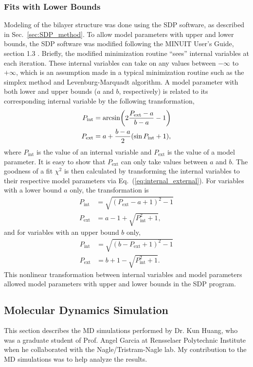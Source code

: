 \subsubsection{Fits with Lower Bounds}
Modeling of the bilayer structure was done using the SDP software, 
as described in Sec.~\ref{sec:SDP_method}.
To allow model parameters with upper and lower bounds, the
SDP software was modified following the MINUIT User's Guide, section 1.3 
\cite{minuit}. 
Briefly, the modified minimization routine ``sees'' internal variables 
at each iteration. These internal variables can take on
any values between $-\infty$ to $+\infty$, which is an assumption made
in a typical minimization routine such as 
the simplex method and Levenburg-Marquadt algorithm.
A model parameter with both lower and upper bounds ($a$ and $b$, respectively) 
is related to its corresponding internal variable by the following transformation,
\begin{align}
  P_\textrm{int} &= \arcsin \mathopen{}\left( 2\frac{P_\textrm{ext}-a}{b-a}-1 \right)\mathclose{}  \\
  P_\textrm{ext} &= a + \frac{b-a}{2}(\sin P_\textrm{int}+1),
  \label{eq:internal_external}
\end{align}
where $P_\text{int}$ is the value of an internal variable and
$P_\text{ext}$ is the value of a model parameter. It is easy to show that
$P_\text{ext}$ can only take values between $a$ and $b$.
The goodness of a fit $\chi^2$ is then calculated by transforming the
internal variables to their respective model parameters via Eq.~(\ref{eq:internal_external}). 
For variables with a lower bound $a$ only, the transformation is
\begin{align}
  P_\textrm{int} &= \sqrt{(P_\textrm{ext}-a+1)^2 - 1} \\
  P_\textrm{ext} &= a - 1 + \sqrt{P_\textrm{int}^2+1}, 
\end{align}
and for variables with an upper bound $b$ only,
\begin{align}
  P_\textrm{int} &= \sqrt{(b-P_\textrm{ext}+1)^2 - 1} \\
  P_\textrm{ext} &= b + 1 - \sqrt{P_\textrm{int}^2+1}.
\end{align}
This nonlinear transformation between internal variables and model parameters 
allowed model parameters with upper and lower bounds in
the SDP program.

\newpage
\subsection{Molecular Dynamics Simulation}\label{sec:sim_methods}
This section describes the MD simulations performed by Dr. Kun Huang, who was
a graduate student of Prof. Angel Garcia at Rensselaer Polytechnic Institute
when he collaborated with the Nagle/Tristram-Nagle lab.
My contribution to the MD simulations was to help analyze the results.

